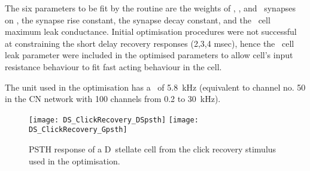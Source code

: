 The six parameters to be fit by the routine are the weights of \GLG\@, \HSR\@, and
\LSR~synapses on \DS\@, the \GABAa synapse rise constant, the \GABAa synapse decay
constant, and the \DS~cell maximum leak conductance. Initial optimisation
procedures were not successful at constraining the short delay recovery
responses (2,3,4 msec), hence the \DS~cell leak
parameter were included in the optimised parameters to allow cell's input
resistance behaviour to fit fast acting behaviour in the cell.

The unit used in the optimisation has a \CF~of
5.8~kHz (equivalent to channel no. 50 in the CN network with 100 channels from
0.2 to 30~kHz).

\begin{figure}[htb]
  \centering
  \texttt{[image: DS\_ClickRecovery\_DSpsth]}%
  \texttt{[image: DS\_ClickRecovery\_Gpsth]}%
  \caption[PSTH response to click recovery stimulus]{PSTH response of a
    D~stellate cell from the click recovery stimulus used in the
    optimisation.  }\label{fig:ClickExamples}
\end{figure}












